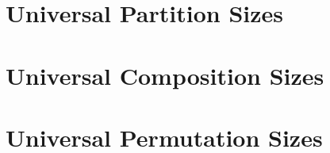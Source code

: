 \chapter{Universal Partition Sizes}
\label{appendix-partitions}



\chapter{Universal Composition Sizes}
\label{appendix-compositions}



\chapter{Universal Permutation Sizes}
\label{appendix-permutations}


